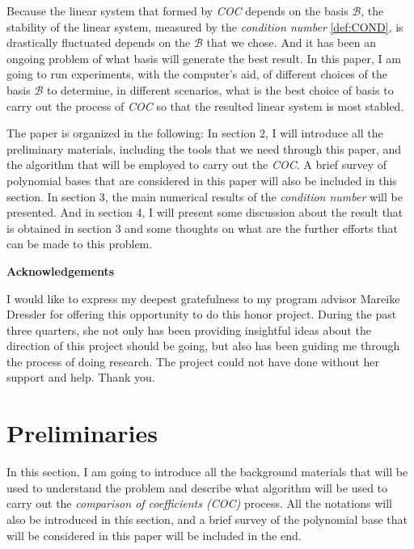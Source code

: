 \documentclass[12pt]{amsart}
\numberwithin{equation}{section}
\theoremstyle{definition}
\numberwithin{thm}{section}
\begin{document}
Because the linear system that formed by \emph{COC} depends on the basis $\mathcal{B}$,
the stability of the linear system, measured by the \emph{condition number} \ref{def:COND}, is drastically fluctuated depends on the $\mathcal{B}$ that we chose. 
And it has been an ongoing problem of what basis will generate the best result.
In this paper, I am going to run experiments, with the computer's aid, of different choices of the basis $\mathcal{B}$ to determine, 
in different scenarios, what is the best choice of basis to carry out the process of \emph{COC} so that the resulted linear system is most stabled. 

The paper is organized in the following: In section 2, I will introduce all the preliminary materials, 
including the tools that we need through this paper, and the algorithm that will be employed to carry out the \emph{COC}.
A brief survey of polynomial bases that are considered in this paper will also be included in this section. 
In section 3, the main numerical results of the \emph{condition number} will be presented. 
And in section 4, I will present some discussion about the result that is obtained in section 3 and some thoughts on what are the further efforts that can be made to this problem.


\newpage

\centerline{\textbf{Acknowledgements}}

I would like to express my deepest gratefulness to my program advisor Mareike Dressler for offering this opportunity to do this honor project. 
During the past three quarters, she not only has been providing insightful ideas about the direction of this project should be going, 
but also has been guiding me through the process of doing research. The project could not have done without her support and help. Thank you.

\newpage

\section{Preliminaries}
\label{Sec:Preliminaries}

In this section, I am going to introduce all the background materials that will be used to 
understand the problem and describe what algorithm will be used to carry out the \emph{comparison of coefficients (COC)}
process. All the notations will also be introduced in this section, 
and a brief survey of the polynomial base that will be considered in this paper will be included in the end.
\end{document}
